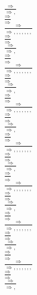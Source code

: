 \documentclass[11pt]{article}
\begin{document}
\begin{center}
\bigskip
\\$\frac{\Rightarrow }{\Rightarrow , }$
\bigskip
\\$\frac{\Rightarrow }{\Rightarrow }$
\bigskip
\\$\frac{\Rightarrow }{\Rightarrow , , , , , , , }$
\bigskip
\\$\frac{\Rightarrow }{\Rightarrow }$
\bigskip
\\$\frac{\Rightarrow }{\Rightarrow , }$
\bigskip
\\$\frac{\Rightarrow }{\Rightarrow }$
\bigskip
\\$\frac{\Rightarrow }{\Rightarrow , , , , , , , }$
\bigskip
\\$\frac{\Rightarrow }{\Rightarrow }$
\bigskip
\\$\frac{\Rightarrow }{\Rightarrow , }$
\bigskip
\\$\frac{\Rightarrow }{\Rightarrow }$
\bigskip
\\$\frac{\Rightarrow }{\Rightarrow , , , , , , , }$
\bigskip
\\$\frac{\Rightarrow }{\Rightarrow }$
\bigskip
\\$\frac{\Rightarrow }{\Rightarrow , }$
\bigskip
\\$\frac{\Rightarrow }{\Rightarrow }$
\bigskip
\\$\frac{\Rightarrow }{\Rightarrow , , , , , , , }$
\bigskip
\\$\frac{\Rightarrow }{\Rightarrow }$
\bigskip
\\$\frac{\Rightarrow }{\Rightarrow , }$
\bigskip
\\$\frac{\Rightarrow }{\Rightarrow }$
\bigskip
\\$\frac{\Rightarrow }{\Rightarrow , , , , , , , }$
\bigskip
\\$\frac{\Rightarrow }{\Rightarrow }$
\bigskip
\\$\frac{\Rightarrow }{\Rightarrow , }$
\bigskip
\\$\frac{\Rightarrow }{\Rightarrow }$
\bigskip
\\$\frac{\Rightarrow }{\Rightarrow , , , , , , , }$
\bigskip
\\$\frac{\Rightarrow }{\Rightarrow }$
\bigskip
\\$\frac{\Rightarrow }{\Rightarrow , }$
\bigskip
\\$\frac{\Rightarrow }{\Rightarrow }$
\bigskip
\\$\frac{\Rightarrow }{\Rightarrow , , , , , , , }$
\bigskip
\\$\frac{\Rightarrow }{\Rightarrow }$
\bigskip
\\$\frac{\Rightarrow }{\Rightarrow , }$

\end{center}
\end{document}

